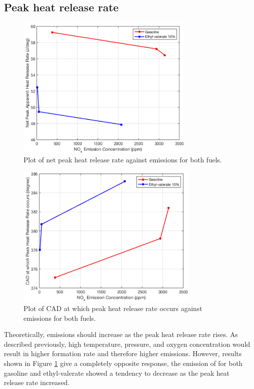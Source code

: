 \documentclass[11pt]{article}
\begin{document}
\subsection*{Peak heat release rate}
\begin{figure}[H]
    \centering
    \includegraphics[height = 7cm]{./img/diagram6.png}
    \caption{Plot of net peak heat release rate against  emissions for both fuels.}
    \label{q2-f3}
\end{figure}
\begin{figure}[H]
    \centering
    \includegraphics[height = 7cm]{./img/diagram7.png}
    \caption{Plot of CAD at which peak heat release rate occurs against  emissions for both fuels.}
    \label{q2-f4}
\end{figure}
Theoretically,  emissions should increase as the peak heat release rate rises. As described previously, high temperature, pressure, and oxygen concentration would result in higher  formation rate and therefore higher emissions. However, results shown in Figure \ref{q2-f3} give a completely opposite response, the emission of  for both gasoline and ethyl-valerate showed a tendency to decrease as the peak heat release rate increased.  
\end{document}
